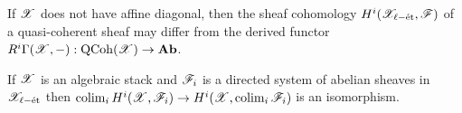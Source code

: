 \documentclass[12pt]{article}
\begin{document}
\begin{rmk}
If $\mathscr{X}$ does not have affine diagonal, then the sheaf cohomology $H^i(\mathscr{X}_{\ell-\text{\'{e}t}}, \mathscr{F})$ of a quasi-coherent sheaf may differ from the derived functor $R^i \Gamma(\mathscr{X}, -) : \mathrm{QCoh}{(\mathscr{X})} \to \mathbf{Ab}$.
\end{rmk}

\begin{prop}
If $\mathscr{X}$ is an algebraic stack and $\mathscr{F}_i$ is a directed system of abelian sheaves in $\mathscr{X}_{\ell-\text{\'{e}t}}$ then $\operatorname*{\mathrm{colim}}_i H^i(\mathscr{X}, \mathscr{F}_i) \to H^i(\mathscr{X}, \operatorname*{\mathrm{colim}}_i \mathscr{F}_i)$ is an isomorphism. 
\end{prop}
\end{document}
